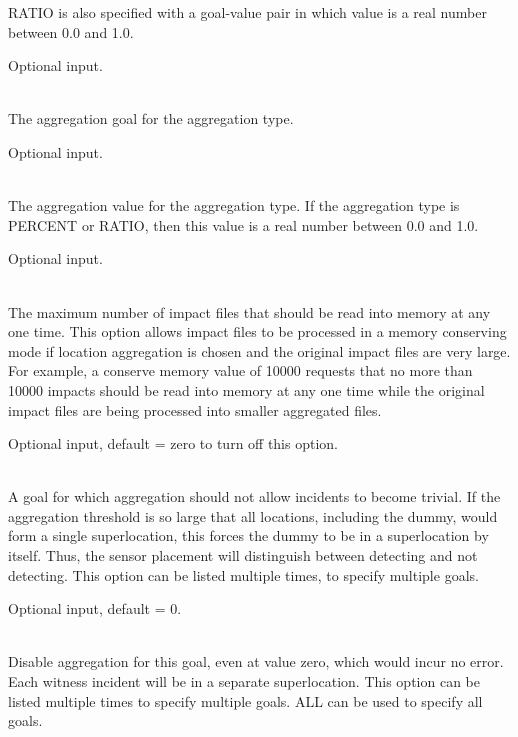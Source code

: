 \begin{description}[topsep=0pt,parsep=0.5em,itemsep=-0.4em]
\begin{description}[topsep=0pt,parsep=0.5em,itemsep=-0.4em]
                RATIO is also specified with a goal-value pair in which value is a real number between
                0.0 and 1.0.
                
                Optional input.
    \item[{goal}]\hfill
\\The aggregation goal for the aggregation type.
                
                Optional input.
    \item[{value}]\hfill
\\The aggregation value for the aggregation type. If the aggregation type is PERCENT or RATIO,
                then this value is a real number between 0.0 and 1.0.
                
                Optional input.
    \item[{conserve memory}]\hfill
\\The maximum number of impact files that should be read into memory 
                at any one time. This option allows impact files to be processed in 
                a memory conserving mode if location aggregation is chosen and the original impact
                files are very large. For example, a conserve memory value of 10000 requests
                that no more than 10000 impacts should be read into memory at any one 
                time while the original impact files are being processed into smaller
                aggregated files.  
				
				Optional input, default = zero to turn off this option.
    \item[{distinguish detection}]\hfill
\\A goal for which aggregation should not allow incidents to
                become trivial. If the aggregation threshold is so large that all
                locations, including the dummy, would form a single superlocation,
                this forces the dummy to be in a superlocation by itself. Thus,
                the sensor placement will distinguish between detecting and not
                detecting. This option can be listed multiple times, to specify
                multiple goals. 
                
                Optional input, default = 0.
    \item[{disable aggregation}]\hfill
\\Disable aggregation for this goal, even at value zero, which
                would incur no error. Each witness incident will be in a separate
                superlocation. This option can be listed multiple times to
                specify multiple goals. ALL can be used to specify
                all goals. 
                

\end{description}
\end{description}
